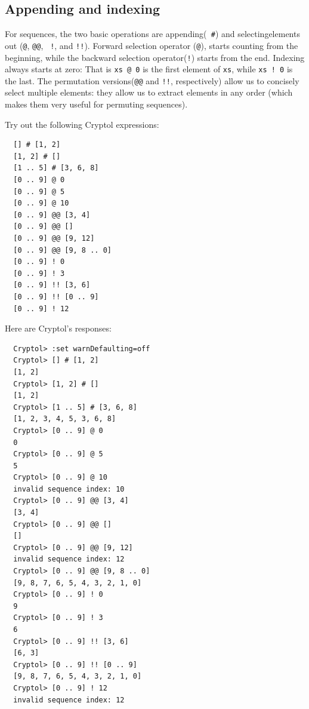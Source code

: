 \subsection{Appending and indexing}
\label{sec:appending-indexing}

For sequences, the two basic operations are appending\indAppend ({\tt
  \#}) and selecting\indIndex elements out ({\tt @}, {\tt @@}, {\tt
  !}, and {\tt !!}).  Forward selection operator ({\tt @}), starts
counting from the beginning, while the backward selection
operator\indRIndex ({\tt !}) starts from the end.  Indexing always
starts at zero: That is {\tt xs @ 0} is the first element of {\tt xs},
while {\tt xs ! 0} is the last.  The permutation\indIndexs
versions\indRIndexs ({\tt @@} and {\tt !!}, respectively) allow us to
concisely select multiple elements: they allow us to extract elements
in any order (which makes them very useful for permuting sequences).


\begin{Exercise}\label{ex:seq:7}
Try out the following Cryptol expressions:
\begin{Verbatim}
  [] # [1, 2]
  [1, 2] # []
  [1 .. 5] # [3, 6, 8]
  [0 .. 9] @ 0
  [0 .. 9] @ 5
  [0 .. 9] @ 10
  [0 .. 9] @@ [3, 4]
  [0 .. 9] @@ []
  [0 .. 9] @@ [9, 12]
  [0 .. 9] @@ [9, 8 .. 0]
  [0 .. 9] ! 0
  [0 .. 9] ! 3
  [0 .. 9] !! [3, 6]
  [0 .. 9] !! [0 .. 9]
  [0 .. 9] ! 12
\end{Verbatim}
\end{Exercise}
\begin{Answer}
Here are Cryptol's responses:
\begin{Verbatim}
  Cryptol> :set warnDefaulting=off
  Cryptol> [] # [1, 2]
  [1, 2]
  Cryptol> [1, 2] # []
  [1, 2]
  Cryptol> [1 .. 5] # [3, 6, 8]
  [1, 2, 3, 4, 5, 3, 6, 8]
  Cryptol> [0 .. 9] @ 0
  0
  Cryptol> [0 .. 9] @ 5
  5
  Cryptol> [0 .. 9] @ 10
  invalid sequence index: 10
  Cryptol> [0 .. 9] @@ [3, 4]
  [3, 4]
  Cryptol> [0 .. 9] @@ []
  []
  Cryptol> [0 .. 9] @@ [9, 12]
  invalid sequence index: 12
  Cryptol> [0 .. 9] @@ [9, 8 .. 0]
  [9, 8, 7, 6, 5, 4, 3, 2, 1, 0]
  Cryptol> [0 .. 9] ! 0
  9
  Cryptol> [0 .. 9] ! 3
  6
  Cryptol> [0 .. 9] !! [3, 6]
  [6, 3]
  Cryptol> [0 .. 9] !! [0 .. 9]
  [9, 8, 7, 6, 5, 4, 3, 2, 1, 0]
  Cryptol> [0 .. 9] ! 12
  invalid sequence index: 12
\end{Verbatim}
\end{Answer}

